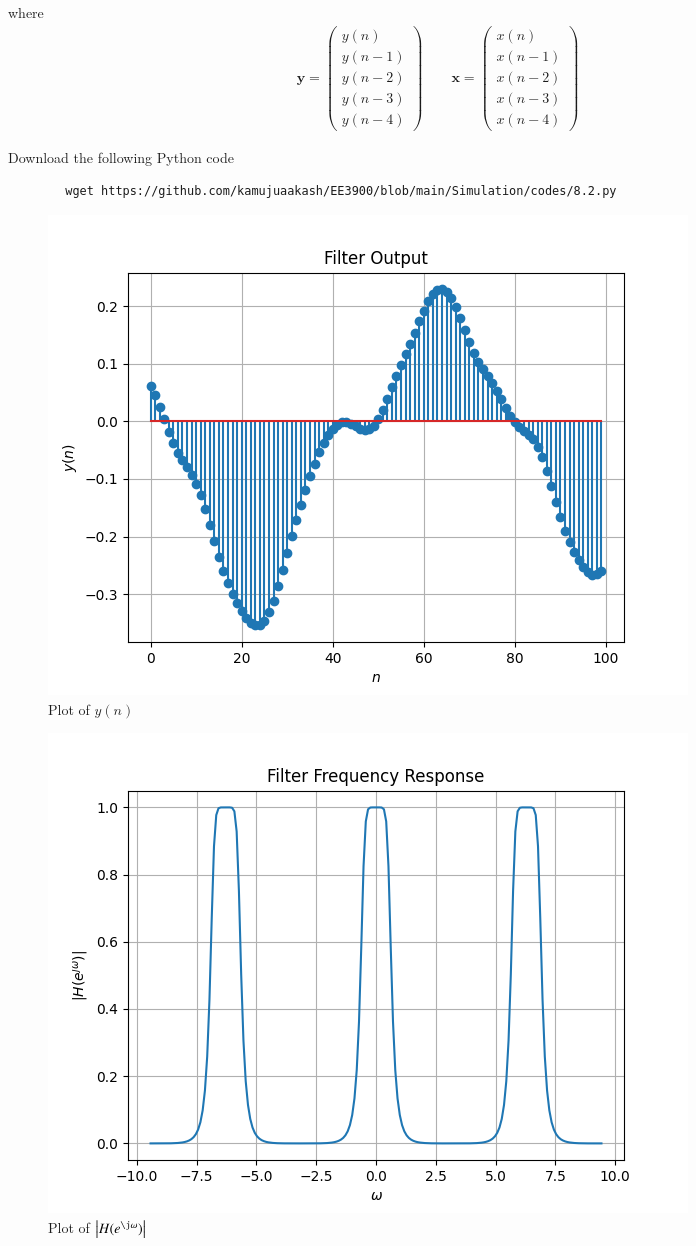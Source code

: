 \documentclass[journal,12pt,twocolumn]{IEEEtran}
\providecommand{\abs}[1]{\left\vert#1\right\vert}
\let\vec\mathbf
\numberwithin{equation}{section}
\renewcommand\thesection{\arabic{section}}
\newcommand{\myvec}[1]{\ensuremath{\begin{pmatrix}#1\end{pmatrix}}}
\begin{document}
\begin{enumerate}[label=\thesection.\arabic*]
	where
	\begin{align}
		\vec{y} = \myvec{y(n) \\ y(n-1) \\ y(n-2) \\ y(n-3) \\ y(n-4)} \qquad
		\vec{x} = \myvec{x(n) \\ x(n-1) \\ x(n-2) \\ x(n-3) \\ x(n-4)}
	\end{align}
	
	Download the following Python code
	\begin{lstlisting}
		wget https://github.com/kamujuaakash/EE3900/blob/main/Simulation/codes/8.2.py
	\end{lstlisting}
	
	\begin{figure}[!ht]
		\centering
		\includegraphics[width=\columnwidth]{./figs/7.2.1.png}
		\caption{Plot of $y(n)$}
		\label{fig-7.2.1}	
	\end{figure}
	
	\begin{figure}[!ht]
		\centering
		\includegraphics[width=\columnwidth]{./figs/7.2.2.png}
		\caption{Plot of $\abs{H(e^{\j\omega})}$}
		\label{fig-7.2.2}	
	\end{figure}
	

\end{enumerate}
\end{document}
